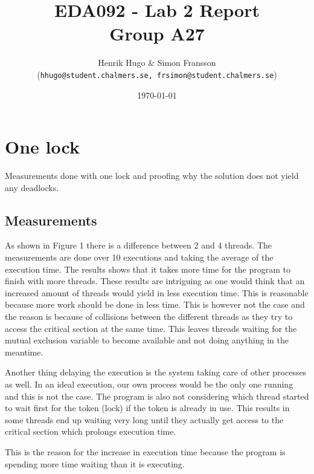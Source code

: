\documentclass[a4paper,11pt,twoside,fleqn]{article}
\title{	
\normalfont \normalsize 
\huge EDA092 - Lab 2 Report \\ Group A27 \\ %
}
\author{Henrik Hugo \& Simon Fransson \\ (\texttt{hhugo@student.chalmers.se, frsimon@student.chalmers.se})} %
\date{\normalsize\today} %
\begin{document}
\maketitle %
\clearpage

\section{One lock}
Measurements done with one lock and proofing why the solution does not yield any deadlocks.
\subsection{Measurements}
As shown in Figure 1 there is a difference between 2 and 4 threads. The measurements are done over 10 executions and taking the average of the execution time. The results shows that it takes more time for the program to finish with more threads. These results are intriguing as one would think that an increased amount of threads would yield in less execution time. This is reasonable because more work should be done in less time. This is however not the case and the reason is because of collisions between the different threads as they try to access the critical section at the same time. This leaves threads waiting for the mutual exclusion variable to become available and not doing anything in the meantime.
\linebreak

Another thing delaying the execution is the system taking care of other processes as well. In an ideal execution, our own process would be the only one running and this is not the case. The program is also not considering which thread started to wait first for the token (lock) if the token is already in use. This results in some threads end up waiting very long until they actually get access to the critical section which prolongs execution time.
\linebreak

This is the reason for the increase in execution time because the program is spending more time waiting than it is  executing.
\end{document}
